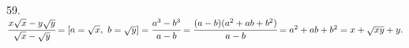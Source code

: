 59. $\cfrac{x\sqrt{x}-y\sqrt{y}}{\sqrt{x}-\sqrt{y}}=[a=\sqrt{x},\ b=\sqrt{y}]=
\cfrac{a^3-b^3}{a-b}=\cfrac{(a-b)(a^2+ab+b^2)}{a-b}=a^2+ab+b^2=x+\sqrt{xy}+y.$\\
